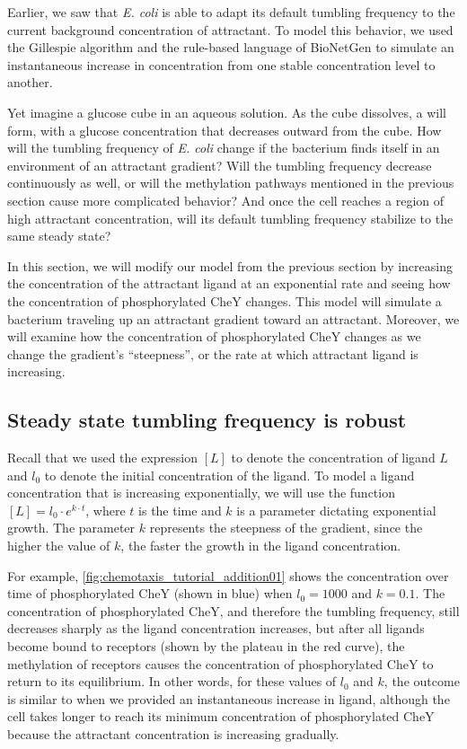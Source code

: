 Earlier, we saw that \textit{E. coli} is able to adapt its default tumbling frequency to the current background concentration of attractant. To model this behavior, we used the Gillespie algorithm and the rule-based language of BioNetGen to simulate an instantaneous increase in concentration from one stable concentration level to another.

Yet imagine a glucose cube in an aqueous solution. As the cube dissolves, a  will form, with a glucose concentration that decreases outward from the cube. How will the tumbling frequency of \textit{E. coli} change if the bacterium finds itself in an environment of an attractant gradient?  Will the tumbling frequency decrease continuously as well, or will the methylation pathways mentioned in the previous section cause more complicated behavior? And once the cell reaches a region of high attractant concentration, will its default tumbling frequency stabilize to the same steady state?

In this section, we will modify our model from the previous section by increasing the concentration of the attractant ligand at an exponential rate and seeing how the concentration of phosphorylated CheY changes. This model will simulate a bacterium traveling up an attractant gradient toward an attractant. Moreover, we will examine how the concentration of phosphorylated CheY changes as we change the gradient's ``steepness'', or the rate at which attractant ligand is increasing.

\subsection{Steady state tumbling frequency is robust}

Recall that we used the expression $[L]$ to denote the concentration of ligand $L$ and $l_0$ to denote the initial concentration of the ligand. To model a ligand concentration that is increasing exponentially, we will use the function $[L] = l_0 \cdot e^{k \cdot t}$, where $t$ is the time and $k$ is a parameter dictating exponential growth. The parameter $k$ represents the steepness of the gradient, since the higher the value of $k$, the faster the growth in the ligand concentration.

For example, \autoref{fig:chemotaxis_tutorial_addition01} shows the concentration over time of phosphorylated CheY (shown in blue) when $l_0 = 1000$ and $k = 0.1$. The concentration of phosphorylated CheY, and therefore the tumbling frequency, still decreases sharply as the ligand concentration increases, but after all ligands become bound to receptors (shown by the plateau in the red curve), the methylation of receptors causes the concentration of phosphorylated CheY to return to its equilibrium. In other words, for these values of $l_0$ and $k$, the outcome is similar to when we provided an instantaneous increase in ligand, although the cell takes longer to reach its minimum concentration of phosphorylated CheY because the attractant concentration is increasing gradually.\\

